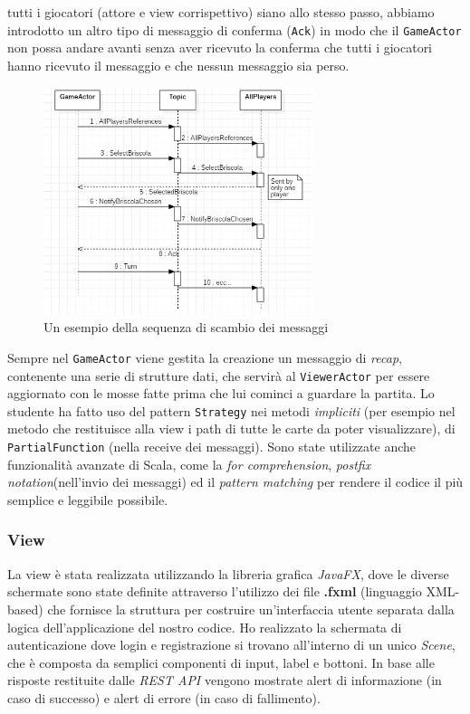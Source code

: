 tutti i giocatori (attore e view corrispettivo) siano allo stesso passo, abbiamo introdotto un altro tipo di messaggio di conferma (\texttt{Ack}) in modo che il \texttt{GameActor} non possa andare avanti senza aver ricevuto la conferma che tutti i giocatori hanno ricevuto il messaggio e che nessun messaggio sia perso. 

\begin{figure}[h!]
 \centering
  \includegraphics[width=0.7\textwidth]{actorsMsgSeq.png}
   \caption{Un esempio della sequenza di scambio dei messaggi}
\end{figure}

Sempre nel \texttt{GameActor} viene gestita la creazione un messaggio di \textit{recap}, contenente una serie di strutture dati, che servirà al \texttt{ViewerActor} per essere aggiornato con le mosse fatte prima che lui cominci a guardare la partita. Lo studente ha fatto uso del pattern \texttt{Strategy} nei metodi \textit{impliciti} (per esempio nel metodo che restituisce alla view i path di tutte le carte da poter visualizzare), di \texttt{PartialFunction} (nella receive dei messaggi). Sono state utilizzate anche funzionalità avanzate di Scala, come la \textit{for comprehension}, \textit{postfix notation}(nell'invio dei messaggi) ed il \textit{pattern matching} per rendere il codice il più semplice e leggibile possibile.

 \subsubsection{View}\label{subsub:jakova:view}
    La view è stata realizzata utilizzando la libreria grafica \textit{JavaFX}, dove le diverse schermate sono state definite attraverso l’utilizzo dei file \textbf{.fxml} (linguaggio XML-based) che fornisce la struttura per costruire un'interfaccia utente separata dalla logica dell'applicazione del nostro codice. Ho realizzato la schermata di autenticazione dove login e registrazione si trovano all’interno di un unico \textit{Scene}, che è composta da semplici componenti di input, label e bottoni. In base alle risposte restituite dalle \textit{REST API} vengono mostrate alert di informazione (in caso di successo) e alert di errore (in caso di fallimento). 

